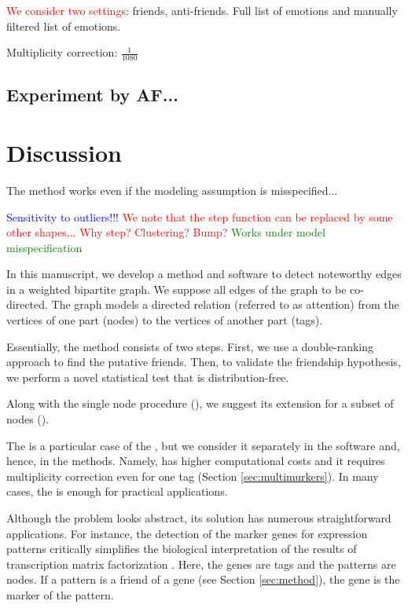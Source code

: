 \documentclass{llncs}
\newcommand{\red}[1]{\textcolor{red}{#1}}
\begin{document}
\red{We consider two settings}: friends, anti-friends. Full list of emotions and manually filtered list of emotions.

Multiplicity correction: $\frac{1}{1080}$

\subsection{Experiment by AF...}
\section{Discussion}
\label{sec:discussion}

The method works even if the modeling assumption is misspecified...

\textcolor{blue}{Sensitivity to outliers!!!}
\textcolor{red}{We note that the step function can be replaced by some other shapes... Why step? Clustering? Bump?}
\textcolor{green}{Works under model misspecification}

In this manuscript, we develop a method and software to detect noteworthy edges in a weighted bipartite graph. We suppose all edges of the graph to be co-directed. The graph models a directed relation (referred to as attention) from the vertices of one part (nodes) to the vertices of another part (tags).

Essentially, the method consists of two steps. First, we use a double-ranking approach to find the putative friends. Then, to validate the friendship hypothesis, we perform a novel statistical test that is distribution-free.

Along with the single node procedure (), we suggest its extension for a subset of nodes ().

The  is a particular case of the , but we consider it separately in the software and, hence, in the methods. Namely,  has higher computational costs and it requires multiplicity correction even for one tag (Section \ref{sec:multimurkers}). In many cases, the  is enough for practical applications. 

Although the problem looks abstract, its solution has numerous straightforward applications. For instance, the detection of the marker genes \cite{stein-obrien_patternmarkers_2017} for expression patterns critically simplifies the biological interpretation of the results of transcription matrix factorization \cite{Stein_2018,Fertig_2016}. Here, the genes are tags and the patterns are nodes. If a pattern is a friend of a gene (see Section \ref{sec:method}), the gene is the marker of the pattern.
\end{document}
